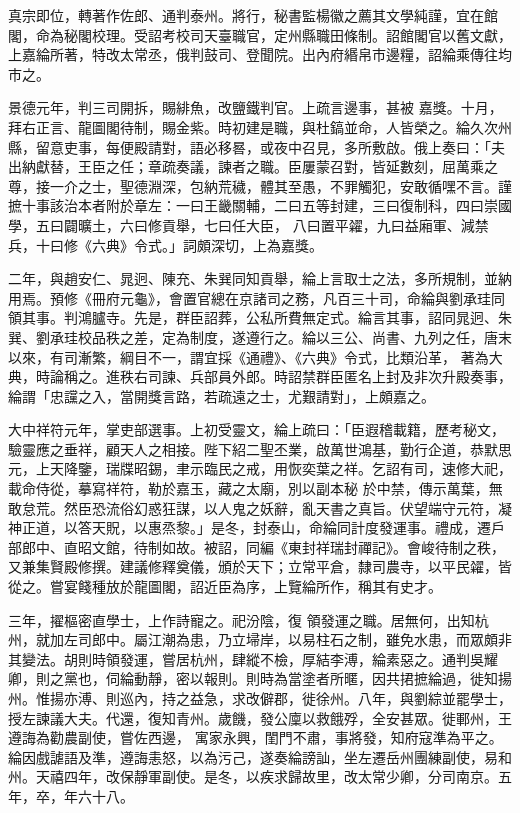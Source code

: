 \begin{pinyinscope}
 真宗即位，轉著作佐郎、通判泰州。將行，秘書監楊徽之薦其文學純謹，宜在館閣，命為秘閣校理。受詔考校司天臺職官，定州縣職田條制。詔館閣官以舊文獻，上嘉綸所著，特改太常丞，俄判鼓司、登聞院。出內府緡帛市邊糧，詔綸乘傳往均市之。



 景德元年，判三司開拆，賜緋魚，改鹽鐵判官。上疏言邊事，甚被
 嘉獎。十月，拜右正言、龍圖閣待制，賜金紫。時初建是職，與杜鎬並命，人皆榮之。綸久次州縣，留意吏事，每便殿請對，語必移晷，或夜中召見，多所敷啟。俄上奏曰：「夫出納獻替，王臣之任；章疏奏議，諫者之職。臣屢蒙召對，皆延數刻，屈萬乘之尊，接一介之士，聖德淵深，包納荒穢，體其至愚，不罪觸犯，安敢循嘿不言。謹摭十事該治本者附於章左：一曰王畿關輔，二曰五等封建，三曰復制科，四曰崇國學，五曰闢曠土，六曰修貢舉，七曰任大臣，
 八曰置平糴，九曰益廂軍、減禁兵，十曰修《六典》令式。」詞頗深切，上為嘉獎。



 二年，與趙安仁、晁迥、陳充、朱巽同知貢舉，綸上言取士之法，多所規制，並納用焉。預修《冊府元龜》，會置官總在京諸司之務，凡百三十司，命綸與劉承珪同領其事。判鴻臚寺。先是，群臣詔葬，公私所費無定式。綸言其事，詔同晁迥、朱巽、劉承珪校品秩之差，定為制度，遂遵行之。綸以三公、尚書、九列之任，唐末以來，有司漸繁，綱目不一，謂宜採《通禮》、《六典》令式，比類沿革，
 著為大典，時論稱之。進秩右司諫、兵部員外郎。時詔禁群臣匿名上封及非次升殿奏事，綸謂「忠讜之入，當開獎言路，若疏遠之士，尤艱請對」，上頗嘉之。



 大中祥符元年，掌吏部選事。上初受靈文，綸上疏曰：「臣遐稽載籍，歷考秘文，驗靈應之垂祥，顧天人之相接。陛下紹二聖丕業，啟萬世鴻基，勤行企道，恭默思元，上天降鑒，瑞牒昭錫，聿示臨民之戒，用恢奕葉之祥。乞詔有司，速修大祀，載命侍從，摹寫祥符，勒於嘉玉，藏之太廟，別以副本秘
 於中禁，傳示萬葉，無敢怠荒。然臣恐流俗幻惑狂謀，以人鬼之妖辭，亂天書之真旨。伏望端守元符，凝神正道，以答天貺，以惠烝黎。」是冬，封泰山，命綸同計度發運事。禮成，遷戶部郎中、直昭文館，待制如故。被詔，同編《東封祥瑞封禪記》。會峻待制之秩，又兼集賢殿修撰。建議修釋奠儀，頒於天下；立常平倉，隸司農寺，以平民糴，皆從之。嘗宴餞種放於龍圖閣，詔近臣為序，上覽綸所作，稱其有史才。



 三年，擢樞密直學士，上作詩寵之。祀汾陰，復
 領發運之職。居無何，出知杭州，就加左司郎中。屬江潮為患，乃立埽岸，以易柱石之制，雖免水患，而眾頗非其變法。胡則時領發運，嘗居杭州，肆縱不檢，厚結李溥，綸素惡之。通判吳耀卿，則之黨也，伺綸動靜，密以報則。則時為當塗者所暱，因共捃摭綸過，徙知揚州。惟揚亦溥、則巡內，持之益急，求改僻郡，徙徐州。八年，與劉綜並罷學士，授左諫議大夫。代還，復知青州。歲饑，發公廩以救餓殍，全安甚眾。徙鄆州，王遵誨為勸農副使，嘗佐西邊，
 寓家永興，閨門不肅，事將發，知府寇準為平之。綸因戲謔語及準，遵誨恚怒，以為污己，遂奏綸謗訕，坐左遷岳州團練副使，易和州。天禧四年，改保靜軍副使。是冬，以疾求歸故里，改太常少卿，分司南京。五年，卒，年六十八。




\end{pinyinscope}
